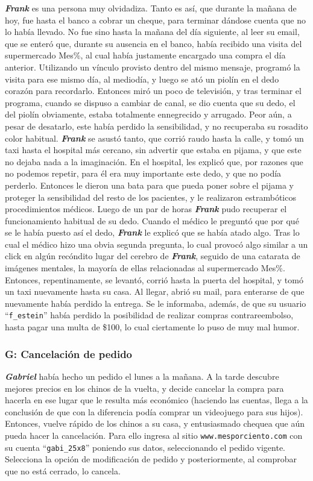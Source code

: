 \textbf{\emph{Frank}} es una persona muy olvidadiza. Tanto es así, que durante
la mañana de hoy, fue hasta el banco a cobrar un cheque, para terminar dándose
cuenta que no lo había llevado. No fue sino hasta la mañana del día siguiente,
al leer su email, que se enteró que, durante su ausencia en el banco, había
recibido una visita del supermercado Mes\%, al cual había justamente encargado
una compra el día anterior. Utilizando un vínculo provisto dentro del mismo
mensaje, programó la visita para ese mismo día, al mediodía, y luego se ató un
piolín en el dedo corazón para recordarlo. Entonces miró un poco de televisión,
y tras terminar el programa, cuando se dispuso a cambiar de canal, se dio cuenta
que su dedo, el del piolín obviamente, estaba totalmente ennegrecido y arrugado.
Peor aún, a pesar de desatarlo, este había perdido la sensibilidad, y no
recuperaba su rosadito color habitual. \textbf{\emph{Frank}} se asustó tanto,
que corrió raudo hasta la calle, y tomó un taxi hasta el hospital más cercano,
sin advertir que estaba en pijama, y que este no dejaba nada a la imaginación.
En el hospital, les explicó que, por razones que no podemos repetir, para él era
muy importante este dedo, y que no podía perderlo. Entonces le dieron una bata
para que pueda poner sobre el pijama y proteger la sensibilidad del resto de los
pacientes, y le realizaron estrambóticos procedimientos médicos. Luego de un par
de horas \textbf{\emph{Frank}} pudo recuperar el funcionamiento habitual de su
dedo. Cuando el médico le preguntó que por qué se le había puesto así el dedo,
\textbf{\emph{Frank}} le explicó que se había atado algo. Tras lo cual el médico
hizo una obvia segunda pregunta, lo cual provocó algo similar a un click en
algún recóndito lugar del cerebro de \textbf{\emph{Frank}}, seguido de una
catarata de imágenes mentales, la mayoría de ellas relacionadas al supermercado
Mes\%. Entonces, repentinamente, se levantó, corrió hasta la puerta del
hospital, y tomó un taxi nuevamente hasta su casa. Al llegar, abrió su mail,
para enterarse de que nuevamente había perdido la entrega. Se le informaba,
además, de que su usuario ``\texttt{f\_estein}'' había perdido la posibilidad de
realizar compras contrareembolso, hasta pagar una multa de \$100, lo cual
ciertamente lo puso de muy mal humor.

\subsubsection{G: Cancelación de pedido}

\textbf{\emph{Gabriel}} había hecho un pedido el lunes a la mañana. A la tarde
descubre mejores precios en los chinos de la vuelta, y decide cancelar la compra
para hacerla en ese lugar que le resulta más económico (haciendo las cuentas,
llega a la conclusión de que con la diferencia podía comprar un videojuego para
sus hijos). Entonces, vuelve rápido de los chinos a su casa, y entusiasmado
chequea que aún pueda hacer la cancelación. Para ello ingresa al sitio
\texttt{www.mesporciento.com} con su cuenta ``\texttt{gabi\_25x8}'' poniendo sus
datos, seleccionando el pedido vigente. Selecciona la opción de modificación de
pedido y posteriormente, al comprobar que no está cerrado, lo cancela.


